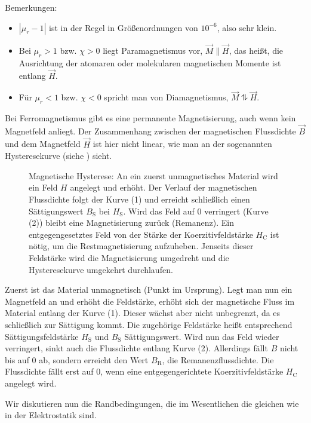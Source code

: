 Bemerkungen:
\begin{itemize}
	\item $\left| \mu _{r}-1\right| $ ist in der Regel in Größenordnungen von $10^{-6}$, also sehr klein.

	\item Bei $\mu _{r}>1$ bzw. $\chi >0$ liegt Paramagnetismus vor, $\vec {M}\parallel \vec {H}$, das heißt, die Ausrichtung der atomaren oder molekularen magnetischen Momente ist entlang $\vec {H}$.

	\item Für $\mu _{r}<1$ bzw. $\chi <0$ spricht man von Diamagnetismus, $\vec {M}\updownharpoons \vec {H}$.
\end{itemize}


Bei Ferromagnetismus gibt es eine permanente Magnetisierung, auch wenn kein Magnetfeld anliegt. Der Zusammenhang zwischen der magnetischen Flussdichte $\vec {B}$ und dem Magnetfeld $\vec {H}$ ist hier nicht linear, wie man an der sogenannten Hysteresekurve (siehe ) sieht.

\begin{figure}[ht]
	\centering
	\tfighysterese
	\caption{Magnetische Hysterese: An ein zuerst unmagnetisches Material wird ein Feld $H$ angelegt und erhöht. Der Verlauf der magnetischen Flussdichte folgt der Kurve (1) und erreicht schließlich einen Sättigungswert $B_\mathrm{S}$ bei $H_\mathrm{S}$. Wird das Feld auf 0 verringert (Kurve (2)) bleibt eine Magnetisierung zurück (Remanenz). Ein entgegengesetztes Feld von der Stärke der Koerzitivfeldstärke $H_\mathrm{C}$ ist nötig, um die Restmagnetisierung aufzuheben. Jenseits dieser Feldstärke wird die Magnetisierung umgedreht und die Hysteresekurve umgekehrt durchlaufen. }
	\label{fig:hysterese}
\end{figure}
Zuerst ist das Material unmagnetisch (Punkt im Ursprung). Legt man nun ein Magnetfeld an und erhöht die Feldstärke, erhöht sich der magnetische Fluss im Material entlang der Kurve (1). Dieser wächst aber nicht unbegrenzt, da es schließlich zur Sättigung kommt. Die zugehörige Feldstärke heißt entsprechend Sättigungsfeldstärke $H_{\mathrm{S}}$ und $B_{\mathrm{S}}$ Sättigungswert. Wird nun das Feld wieder verringert, sinkt auch die Flussdichte entlang Kurve (2). Allerdings fällt $B$ nicht bis auf $0$ ab, sondern erreicht den Wert $B_{\mathrm{R}}$, die Remanenzflussdichte. Die Flussdichte fällt erst auf $0$, wenn eine entgegengerichtete Koerzitivfeldstärke $H_{\mathrm{C}}$ angelegt wird.

Wir diskutieren nun die Randbedingungen, die im Wesentlichen die gleichen wie in der Elektrostatik sind.

